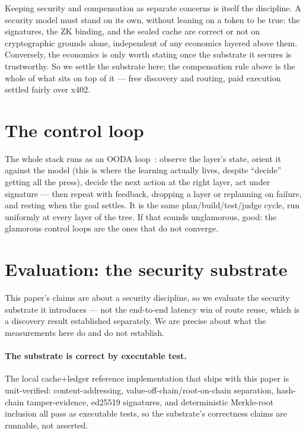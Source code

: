 \documentclass[11pt]{article}
\begin{document}
Keeping security and compensation as separate concerns is itself the discipline. A security
model must stand on its own, without leaning on a token to be true: the signatures,
the ZK binding, and the sealed cache are correct or not on cryptographic grounds
alone, independent of any economics layered above them. Conversely, the economics
is only worth stating once the substrate it secures is trustworthy. So we settle
the substrate here; the compensation rule above is the whole of what sits on top of
it --- free discovery and routing, paid execution settled fairly over x402.
\section{The control loop}

The whole stack runs as an OODA loop~\cite{ooda}: observe the layer's state, orient
it against the model (this is where the learning actually lives, despite ``decide''
getting all the press), decide the next action at the right layer, act under
signature --- then repeat with feedback, dropping a layer or replanning on failure,
and resting when the goal settles. It is the same plan/build/test/judge cycle, run
uniformly at every layer of the tree. If that sounds unglamorous, good: the
glamorous control loops are the ones that do not converge.



\section{Evaluation: the security substrate}

This paper's claims are about a security discipline, so we evaluate the security
substrate it introduces --- not the end-to-end latency win of route reuse, which is
a discovery result established separately. We
are precise about what the measurements here do and do not establish.

\paragraph{The substrate is correct by executable test.} The local cache+ledger
reference implementation that ships with this paper is unit-verified:
content-addressing, value-off-chain/root-on-chain separation, hash-chain
tamper-evidence, ed25519 signatures, and deterministic Merkle-root inclusion all
pass as executable tests, so the substrate's correctness claims are runnable, not
asserted.
\end{document}
